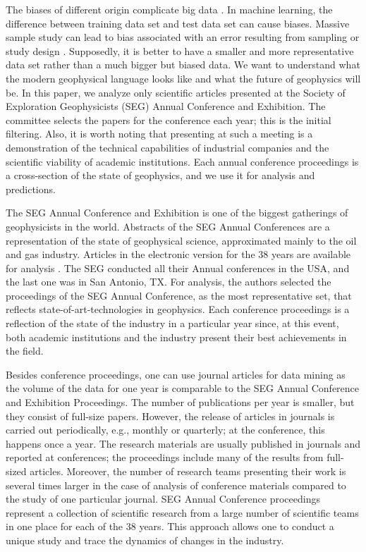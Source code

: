 \documentclass[geosciences,article,submit,moreauthors,pdftex]{Definitions/mdpi}
\begin{document}
The biases of different origin complicate big data \citep{Glauner2018}. In machine learning, the difference between training data set and test data set can cause biases. Massive sample study can lead to bias associated with an error resulting from sampling or study design \citep{Kaplan2014}. Supposedly, it is better to have a smaller and more representative data set rather than a much bigger but biased data. We want to understand what the modern geophysical language looks like and what the future of geophysics will be. In this paper, we analyze only scientific articles presented at the Society of Exploration Geophysicists (SEG) Annual Conference and Exhibition. The committee selects the papers for the conference each year; this is the initial filtering. Also, it is worth noting that presenting at such a meeting is a demonstration of the technical capabilities of industrial companies and the scientific viability of academic institutions. Each annual conference proceedings is a cross-section of the state of geophysics, and we use it for analysis and predictions.

The SEG Annual Conference and Exhibition is one of the biggest gatherings of geophysicists in the world. Abstracts of the SEG Annual Conferences are a representation of the state of geophysical science, approximated mainly to the oil and gas industry. Articles in the electronic version for the 38 years are available for analysis \citep{SEG}. The SEG conducted all their Annual conferences in the USA, and the last one was in San Antonio, TX. For analysis, the authors selected the proceedings of the SEG Annual Conference, as the most representative set, that reflects state-of-art-technologies in geophysics. Each conference proceedings is a reflection of the state of the industry in a particular year since, at this event, both academic institutions and the industry present their best achievements in the field.

Besides conference proceedings, one can use journal articles for data mining as the volume of the data for one year is comparable to the SEG Annual Conference and Exhibition Proceedings. The number of publications per year is smaller, but they consist of full-size papers. However, the release of articles in journals is carried out periodically, e.g., monthly or quarterly; at the conference, this happens once a year. The research materials are usually published in journals and reported at conferences; the proceedings include many of the results from full-sized articles. Moreover, the number of research teams presenting their work is several times larger in the case of analysis of conference materials compared to the study of one particular journal. SEG Annual Conference proceedings represent a collection of scientific research from a large number of scientific teams in one place for each of the 38 years. This approach allows one to conduct a unique study and trace the dynamics of changes in the industry.
\end{document}
